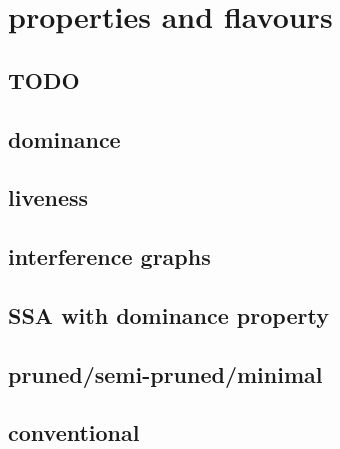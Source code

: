 \applynumberofpages\chapter{properties and flavours }
\section{TODO}

\section{dominance}
\section{liveness}
\section{interference graphs}
\section{SSA with dominance property}
\section{pruned/semi-pruned/minimal}
\section{conventional}

